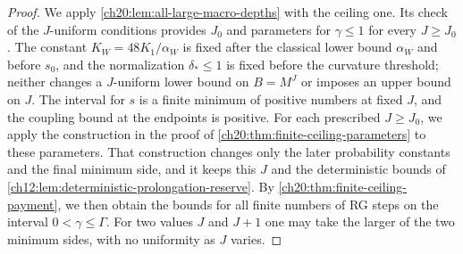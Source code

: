 \begin{proof}
We apply \cref{ch20:lem:all-large-macro-depths} with the ceiling one. Its check of the $J$-uniform conditions provides $J_0$ and parameters for $\gamma\le1$ for every $J\ge J_0$. The constant $K_W=48K_1/\alpha_W$ is fixed after the classical lower bound $\alpha_W$ and before $s_0$, and the normalization $\delta_*\le1$ is fixed before the curvature threshold; neither changes a $J$-uniform lower bound on $B=M^J$ or imposes an upper bound on $J$. The interval for $s$ is a finite minimum of positive numbers at fixed $J$, and the coupling bound at the endpoints is positive. For each prescribed $J\ge J_0$, we apply the construction in the proof of \cref{ch20:thm:finite-ceiling-parameters} to these parameters. That construction changes only the later probability constants and the final minimum side, and it keeps this $J$ and the deterministic bounds of \cref{ch12:lem:deterministic-prolongation-reserve}. By \cref{ch20:thm:finite-ceiling-payment}, we then obtain the bounds for all finite numbers of RG steps on the interval $0<\gamma\le\Gamma$. For two values $J$ and $J+1$ one may take the larger of the two minimum sides, with no uniformity as $J$ varies.
\end{proof}
